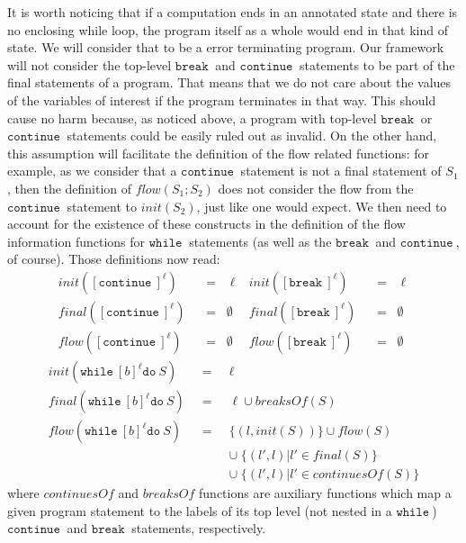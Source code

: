 \documentclass[a4wide,12pt]{article}
\def\eq{\;\; = \;\;}
\def\while{\texttt{while}\ }
\def\do {\texttt{do}\ }
\def\cont {\texttt{continue}\ }
\def\breakc{\texttt{break}\ }
\begin{document}
It is worth noticing that if a computation ends in an annotated state and there is
no enclosing while loop, the program itself as a whole would end in that kind of state.
We will consider that to be a error terminating program. Our framework will not consider
the top-level $\breakc$ and $\cont$ statements to be part of the final statements of
a program. That means that we do not care about the values of the variables of interest
if the program terminates in that way. 
This should cause no harm because, as noticed above, a program with top-level
$\breakc$ or $\cont$ statements could be easily ruled out as invalid. 
On the other hand, this assumption will facilitate the definition of
the flow related functions: for example, as we consider that a $\cont$ statement is not
a final statement of $S_1$, then the definition of $flow(S_1;S_2)$ does not consider the flow
from the $\cont$ statement to $init(S_2)$, just like one would expect. We then need to account
for the existence of these constructs in the definition of the flow information functions
for $\while$ statements (as well as the $\breakc$ and $\cont$, of course).
Those definitions now read:
\begin{align*}
init ([\cont]^\ell) &\eq \ell & init ([\breakc]^\ell) &\eq \ell \\
final([\cont]^\ell) &\eq \emptyset & final([\breakc]^\ell) &\eq \emptyset \\
flow ([\cont]^\ell) &\eq \emptyset & flow ([\breakc]^\ell) &\eq \emptyset
\end{align*}
\begin{eqnarray*}
init (\while [b]^\ell \do S) &\eq& \ell \\
final(\while [b]^\ell \do S) &\eq& \ell \cup breaksOf(S) \\
flow (\while [b]^\ell \do S) &\eq& \{(l,init(S))\} \cup flow(S) \\
                            & & \cup\; \{(l',l) | l' \in final(S)\} \\
                            & & \cup\; \{(l',l) | l' \in continuesOf(S)\}
\end{eqnarray*}
where $continuesOf$ and $breaksOf$ functions are auxiliary functions which map a given program statement
to the labels of its top level (not nested in a $\while$) $\cont$ and $\breakc$ statements, respectively.
 
\end{document}
